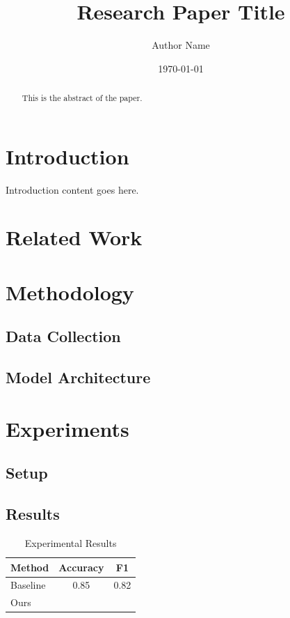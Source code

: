 \documentclass[12pt,a4paper]{article}
\title{Research Paper Title}
\author{Author Name}
\date{\today}
\begin{document}
\maketitle

\begin{abstract}
This is the abstract of the paper.
\end{abstract}

\section{Introduction}

Introduction content goes here.

\section{Related Work}

\section{Methodology}

\subsection{Data Collection}

\subsection{Model Architecture}

\section{Experiments}

\subsection{Setup}

\subsection{Results}

\begin{table}[h]
\centering
\caption{Experimental Results}
\label{tab:results}
\begin{tabular}{lcc}
\toprule
Method & Accuracy & F1 \\
\midrule
Baseline & 0.85 & 0.82 \\
Ours & & \\
\bottomrule
\end{tabular}
\end{table}
\end{document}
